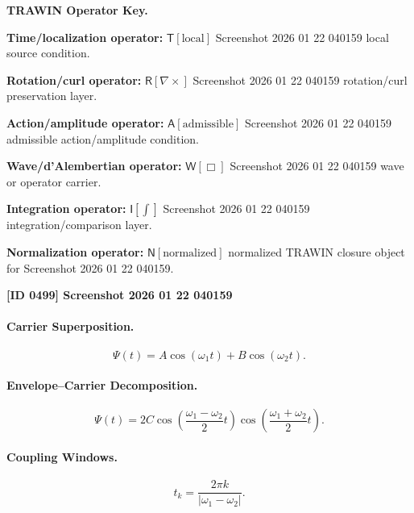 \par\vspace{0.45\baselineskip}
\noindent\begin{minipage}[t]{\linewidth}
\begingroup
\small
\raggedright
\textbf{TRAWIN Operator Key.}\par
\noindent\textbf{Time/localization operator:} $\mathsf{T}\!\left[\mathrm{local}\right]$ Screenshot 2026 01 22 040159 local source condition.\par
\noindent\textbf{Rotation/curl operator:} $\mathsf{R}\!\left[\nabla\times\right]$ Screenshot 2026 01 22 040159 rotation/curl preservation layer.\par
\noindent\textbf{Action/amplitude operator:} $\mathsf{A}\!\left[\mathrm{admissible}\right]$ Screenshot 2026 01 22 040159 admissible action/amplitude condition.\par
\noindent\textbf{Wave/d'Alembertian operator:} $\mathsf{W}\!\left[\Box\right]$ Screenshot 2026 01 22 040159 wave or operator carrier.\par
\noindent\textbf{Integration operator:} $\mathsf{I}\!\left[\int\right]$ Screenshot 2026 01 22 040159 integration/comparison layer.\par
\noindent\textbf{Normalization operator:} $\mathsf{N}\!\left[\mathrm{normalized}\right]$ normalized TRAWIN closure object for Screenshot 2026 01 22 040159.\par
\endgroup
\end{minipage}

\clearpage
\noindent\textbf{[ID 0499] Screenshot 2026 01 22 040159}\par
\vspace{0.35em}
\paragraph{Carrier Superposition.}
\begin{equation}
\Psi(t)=A\cos(\omega_1t)+B\cos(\omega_2t).
\end{equation}

\paragraph{Envelope--Carrier Decomposition.}
\begin{equation}
\Psi(t)
=
2C
\cos\left(
\frac{\omega_1-\omega_2}{2}t
\right)
\cos\left(
\frac{\omega_1+\omega_2}{2}t
\right).
\end{equation}

\paragraph{Coupling Windows.}
\begin{equation}
t_k=
\frac{2\pi k}{|\omega_1-\omega_2|}.
\end{equation}

